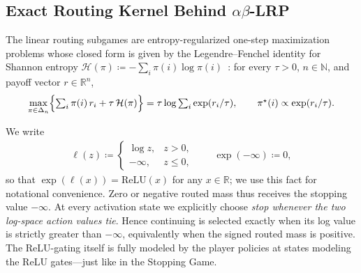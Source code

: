\documentclass[twoside]{article}
\newcommand{\NN}{\mathbb{N}}
\newcommand{\RR}{\mathbb{R}}
\newcommand{\1}{\mathbf{1}}
\begin{document}
\subsection{Exact Routing Kernel Behind \texorpdfstring{$\alpha\beta$-\ac{LRP}}{alpha-beta LRP}}\label{app:routing-kernel}

The linear routing subgames are entropy-regularized one-step maximization problems whose closed
form is given by the Legendre--Fenchel identity for Shannon entropy $\mathcal{H}(\pi) \coloneqq
    -\sum_i \pi(i)\log\pi(i)$~\citep{BoydVandenberghe2004}: for every $\tau>0$, $n\in\NN$, and payoff
vector $r \in \RR^n$,
\begin{align}\label{eq:gibbs-lse}
    \max_{\pi \in \Delta_n} \Bigl\{ \textstyle\sum_{i} \pi(i)\, r_i + \tau\, \mathcal{H}(\pi) \Bigr\}
    = \tau \log \textstyle\sum_{i} \exp(r_i/\tau),
    \qquad \pi^\star(i) \propto \exp(r_i/\tau).
\end{align}

We write
\begin{align}
    \ell(z) \coloneqq
    \begin{cases}
        \log z, & z > 0, \\
        -\infty, & z \le 0,
    \end{cases}
    \qquad \exp(-\infty) \coloneqq 0,
\end{align}
so that $\exp(\ell(x)) = \text{ReLU}(x)$ for any $x \in \RR$; we use this fact for notational
convenience. Zero or negative routed mass thus receives the stopping value $-\infty$. At every activation state we explicitly choose \emph{stop whenever the two log-space action values tie}. Hence continuing is selected exactly when its log value is strictly greater than $-\infty$, equivalently when the signed routed mass is positive. The ReLU-gating itself is fully modeled by the player policies at states modeling the
ReLU gates---just like in the Stopping Game.
\end{document}
